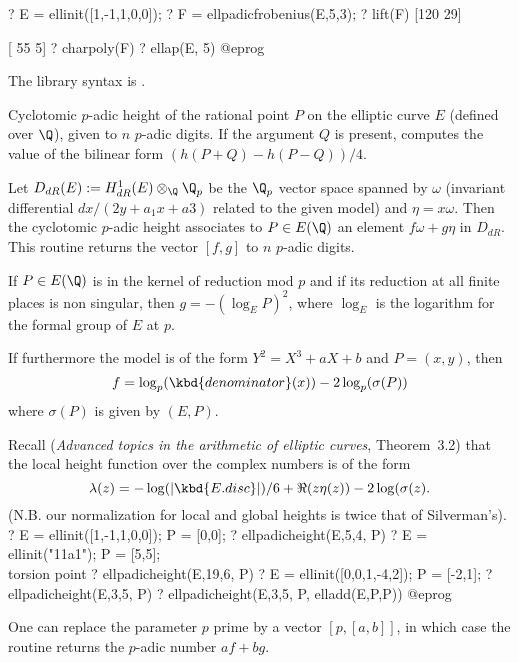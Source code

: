 \bprog
? E = ellinit([1,-1,1,0,0]);
? F = ellpadicfrobenius(E,5,3);
? lift(F)
[120 29]

[ 55  5]
? charpoly(F)
? ellap(E, 5)
@eprog

The library syntax is .

\label{se:ellpadicheight}
Cyclotomic $p$-adic height of the rational point $P$ on the elliptic curve
$E$ (defined over $\Q$), given to $n$ $p$-adic digits.
If the argument $Q$ is present, computes the value of the bilinear
form $(h(P+Q)-h(P-Q)) / 4$.

Let $D_{dR}(E) := H^1_{dR}(E) \otimes_\Q \Q_p$ be the $\Q_p$ vector space
spanned by $\omega$
(invariant differential $dx/(2y+a_1x+a3)$ related to the given model) and
$\eta = x \omega$. Then the cyclotomic $p$-adic height associates to
$P\in E(\Q)$ an element $f \omega + g\eta$ in $D_{dR}$.
This routine returns the vector $[f, g]$ to $n$ $p$-adic digits.

If $P\in E(\Q)$ is in the kernel of reduction mod $p$ and if its reduction
at all finite places is non singular, then $g = -(\log_E P)^2$, where
$\log_E$ is the logarithm for the formal group of $E$ at $p$.

If furthermore the model is of the form $Y^2 = X^3 + a X + b$ and $P = (x,y)$,
then
  $$ f = \log_p(\kbd{denominator}(x)) - 2 \log_p(\sigma(P))$$
where $\sigma(P)$ is given by $(E,P)$.

Recall (\emph{Advanced topics in the arithmetic of elliptic
curves}, Theorem~3.2) that the local height function over the complex numbers
is of the form
  $$ \lambda(z) = -\log (|\kbd{E.disc}|) / 6 + \Re(z \eta(z)) - 2 \log(
  \sigma(z). $$
(N.B. our normalization for local and global heights is twice that of
Silverman's).
\bprog
 ? E = ellinit([1,-1,1,0,0]); P = [0,0];
 ? ellpadicheight(E,5,4, P)
 ? E = ellinit("11a1"); P = [5,5]; \\ torsion point
 ? ellpadicheight(E,19,6, P)
 ? E = ellinit([0,0,1,-4,2]); P = [-2,1];
 ? ellpadicheight(E,3,5, P)
 ? ellpadicheight(E,3,5, P, elladd(E,P,P))
@eprog

One can replace the parameter $p$ prime by a vector $[p,[a,b]]$, in which
case the routine returns the $p$-adic number $af + bg$.

